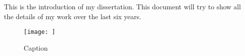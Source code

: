This is the introduction of my dissertation. This document will try to show all the details of my work over the last six years.

\begin{figure}
    \centering
    \texttt{[image: ]}
    \caption{Caption}
    \label{fig:my_label}
\end{figure}